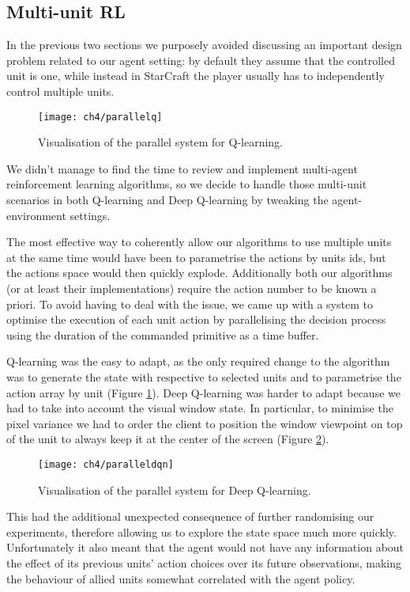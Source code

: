 \subsection{Multi-unit RL}

In the previous two sections we purposely avoided discussing an important design
problem related to our agent setting: by default they assume that the controlled
unit is one, while instead in StarCraft the player usually has to independently
control multiple units.

\begin{figure}[h]
    \centering
    \texttt{[image: ch4/parallelq]}
    \caption{Visualisation of the parallel system for Q-learning.}
    \label{fig:parallelq}
\end{figure}

We didn't manage to find the time to review and implement multi-agent
reinforcement learning algorithms, so we decide to handle those multi-unit
scenarios in both Q-learning and Deep Q-learning by tweaking the
agent-environment settings.

The most effective way to coherently allow our algorithms to use multiple units
at the same time would have been to parametrise the actions by units ids, but
the actions space would then quickly explode. Additionally both our algorithms
(or at least their implementations) require the action number to be known a
priori. To avoid having to deal with the issue, we came up with a system to
optimise the execution of each unit action by parallelising the decision process
using the duration of the commanded primitive as a time buffer.

Q-learning was the easy to adapt, as the only required change to the algorithm
was to generate the state with respective to selected units and to parametrise
the action array by unit (Figure \ref{fig:parallelq}). Deep Q-learning was
harder to adapt because we had to take into account the visual window state. In
particular, to minimise the pixel variance we had to order the client to
position the window viewpoint on top of the unit to always keep it at the center
of the screen (Figure \ref{fig:paralleldqn}).

\begin{figure}[h]
    \centering
    \texttt{[image: ch4/paralleldqn]}
    \caption{Visualisation of the parallel system for Deep Q-learning.}
    \label{fig:paralleldqn}
\end{figure}

This had the additional unexpected consequence of further randomising our
experiments, therefore allowing us to explore the state space much more quickly.
Unfortunately it also meant that the agent would not have any information about
the effect of its previous units' action choices over its future observations,
making the behaviour of allied units somewhat correlated with the agent policy.

